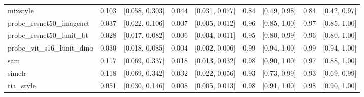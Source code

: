 \begin{tabular}{lrrrrrrrr}
mixstyle & 0.103 & [0.058, 0.303] & 0.044 & [0.031, 0.077] & 0.84 & [0.49, 0.98] & 0.84 & [0.42, 0.97] \\
probe\_resnet50\_imagenet & 0.037 & [0.022, 0.106] & 0.007 & [0.005, 0.012] & 0.96 & [0.85, 1.00] & 0.97 & [0.85, 1.00] \\
probe\_resnet50\_lunit\_bt & 0.028 & [0.017, 0.082] & 0.006 & [0.004, 0.011] & 0.95 & [0.80, 0.99] & 0.96 & [0.80, 1.00] \\
probe\_vit\_s16\_lunit\_dino & 0.030 & [0.018, 0.085] & 0.004 & [0.002, 0.006] & 0.99 & [0.94, 1.00] & 0.99 & [0.94, 1.00] \\
sam & 0.117 & [0.069, 0.337] & 0.018 & [0.013, 0.032] & 0.98 & [0.90, 1.00] & 0.97 & [0.88, 1.00] \\
simclr & 0.118 & [0.069, 0.342] & 0.032 & [0.022, 0.056] & 0.93 & [0.73, 0.99] & 0.93 & [0.69, 0.99] \\
tia\_style & 0.051 & [0.030, 0.146] & 0.008 & [0.005, 0.013] & 0.98 & [0.91, 1.00] & 0.98 & [0.90, 1.00] \\
\bottomrule
\end{tabular}
